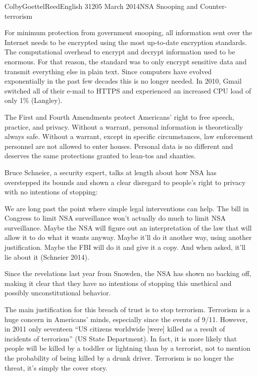 \documentclass[12pt]{article}
\begin{document}
\begin{mla}{Colby}{Goettel}{Reed}{English 312}{05 March 2014}{NSA Snooping and Counter-terrorism}

For minimum protection from government snooping, all information sent over the Internet needs to be encrypted using the most up-to-date encryption standards. The computational overhead to encrypt and decrypt information used to be enormous. For that reason, the standard was to only encrypt sensitive data and transmit everything else in plain text. Since computers have evolved exponentially in the past few decades this is no longer needed. In 2010, Gmail switched all of their e-mail to HTTPS and experienced an increased CPU load of only 1\% (Langley).

The First and Fourth Amendments protect Americans' right to free speech, practice, and privacy. Without a warrant, personal information is theoretically always safe. Without a warrant, except in specific circumstances, law enforcement personnel are not allowed to enter houses. Personal data is no different and deserves the same protections granted to lean-tos and shanties.

Bruce Schneier, a security expert, talks at length about how NSA has overstepped its bounds and shown a clear disregard to people's right to privacy with no intentions of stopping:
\begin{mlaquote}
    We are long past the point where simple legal interventions can help. The bill in Congress to limit NSA surveillance won't actually do much to limit NSA surveillance. Maybe the NSA will figure out an interpretation of the law that will allow it to do what it wants anyway. Maybe it'll do it another way, using another justification. Maybe the FBI will do it and give it a copy. And when asked, it'll lie about it (Schneier 2014).
\end{mlaquote}
Since the revelations last year from Snowden, the NSA has shown no backing off, making it clear that they have no intentions of stopping this unethical and possibly unconstitutional behavior.

The main justification for this breach of trust is to stop terrorism. Terrorism is a huge concern in Americans' minds, especially since the events of 9/11. However, in 2011 only seventeen ``US citizens worldwide [were] killed as a result of incidents of terrorism'' (US State Department). In fact, it is more likely that people will be killed by a toddler or lightning than by a terrorist, not to mention the probability of being killed by a drunk driver. Terrorism is no longer the threat, it's simply the cover story.


\end{mla}
\end{document}
